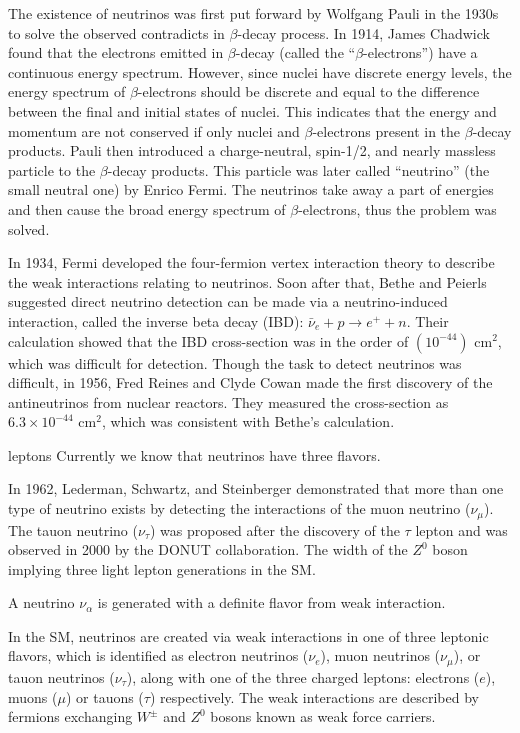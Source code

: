 The existence of neutrinos was first put forward by Wolfgang Pauli in the 1930s to solve the observed contradicts in $\beta$-decay process. In 1914, James Chadwick found that the electrons emitted in $\beta$-decay (called the ``$\beta$-electrons'') have a continuous energy spectrum\cite{leite1996weak}. However, since nuclei have discrete energy levels, the energy spectrum of $\beta$-electrons should be discrete and equal to the difference between the final and initial states of nuclei. This indicates that the energy and momentum are not conserved if only nuclei and $\beta$-electrons present in the $\beta$-decay products. Pauli then introduced a charge-neutral, spin-1/2, and nearly massless particle to the $\beta$-decay products. This particle was later called ``neutrino'' (the small neutral one) by Enrico Fermi. The neutrinos take away a part of energies and then cause the broad energy spectrum of $\beta$-electrons, thus the problem was solved. 

In 1934, Fermi developed the four-fermion vertex interaction theory to describe the weak interactions relating to neutrinos. Soon after that, Bethe and Peierls suggested direct neutrino detection can be made via a neutrino-induced interaction, called the inverse beta decay (IBD): $\bar{\nu}_e+p\to e^+ + n$. Their calculation showed that the IBD cross-section was in the order of $(10^{-44})$ cm$^2$, which was difficult for detection\cite{bethe1934neutrino}. Though the task to detect neutrinos was difficult, in 1956, Fred Reines and Clyde Cowan made the first discovery of the antineutrinos from nuclear reactors. They measured the cross-section as $6.3\times10^{-44}$ cm$^2$, which was consistent with Bethe's calculation\cite{reines1960detection}.

leptons
Currently we know that neutrinos have three flavors. 

In 1962, Lederman, Schwartz, and Steinberger demonstrated that more than one type of neutrino exists by detecting the interactions of the muon neutrino ($\nu_\mu$). The tauon neutrino ($\nu_\tau$) was proposed after the discovery of the $\tau$ lepton and was observed in 2000 by the DONUT collaboration. The width of the $Z^0$ boson implying three light lepton generations in the SM.

A neutrino $\nu_\alpha$ is generated with a definite flavor from weak interaction.


In the SM, neutrinos are created via weak interactions in one of three leptonic flavors, which is identified as electron neutrinos ($\nu_e$), muon neutrinos ($\nu_\mu$), or tauon neutrinos ($\nu_\tau$), along with one of the three charged leptons: electrons ($e$), muons ($\mu$) or tauons ($\tau$) respectively. The weak interactions are described by fermions exchanging $W^{\pm}$ and $Z^0$ bosons known as weak force carriers.





